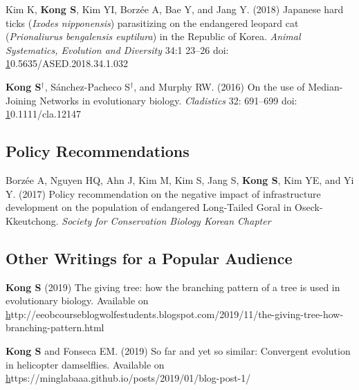 \documentclass[11pt]{article}
\begin{document}
\begin{etaremune}
\item Kim K, \textbf{Kong S}, Kim YI, Borzée A, Bae Y, and Jang Y. (2018) Japanese hard ticks (\textit{Ixodes nipponensis}) parasitizing on the endangered leopard cat (\textit{Prionaliurus bengalensis euptilura}) in the Republic of Korea. \textit{Animal Systematics, Evolution and Diversity} 34:1 23–26 doi: \href{10.5635/ASED.2018.34.1.032}10.5635/ASED.2018.34.1.032
\item \textbf{Kong S}{$^\dag$}, Sánchez-Pacheco S{$^\dag$}, and Murphy RW. (2016) On the use of Median-Joining Networks in evolutionary biology. \textit{Cladistics} 32: 691–699 doi: \href{https://doi.org/10.1111/cla.12147}10.1111/cla.12147

\end{etaremune}

\subsection*{Policy Recommendations}
\begin{etaremune}


\item Borzée A, Nguyen HQ, Ahn J, Kim M, Kim S, Jang S, \textbf{Kong S}, Kim YE, and Yi Y. (2017) Policy recommendation on the negative impact of infrastructure development on the population of endangered Long-Tailed Goral in Oseck-Kkeutchong. \textit{Society for Conservation Biology Korean Chapter}

\end{etaremune}

\subsection*{Other Writings for a Popular Audience}
\begin{etaremune}

\item \textbf{Kong S} (2019) The giving tree: how the branching pattern of a tree is used in evolutionary biology. Available on \href{http://eeobcourseblogwolfestudents.blogspot.com/2019/11/the-giving-tree-how-branching-pattern.html}http://eeobcourseblogwolfestudents.blogspot.com/2019/11/the-giving-tree-how-branching-pattern.html
\item \textbf{Kong S} and Fonseca  EM. (2019) So far and yet so similar: Convergent evolution in helicopter damselflies. Available on \href{https://minglabaaa.github.io/posts/2019/01/blog-post-1/}https://minglabaaa.github.io/posts/2019/01/blog-post-1/



\end{etaremune}
\end{document}
